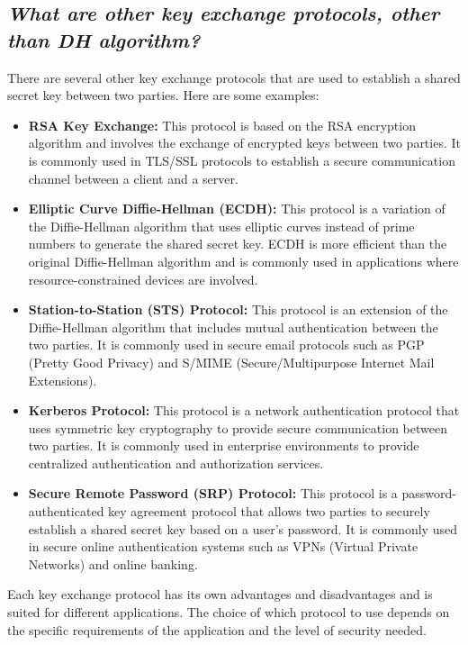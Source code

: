 \documentclass{article}
\begin{document}
\subsection{\textit{What are other key exchange protocols, other than DH algorithm?}}
There are several other key exchange protocols that are used to establish a shared secret key between two parties. Here are some examples:
\begin{itemize}
    \item \textbf{RSA Key Exchange:} This protocol is based on the RSA encryption algorithm and involves the exchange of encrypted keys between two parties. It is commonly used in TLS/SSL protocols to establish a secure communication channel between a client and a server.
    \item \textbf{Elliptic Curve Diffie-Hellman (ECDH):} This protocol is a variation of the Diffie-Hellman algorithm that uses elliptic curves instead of prime numbers to generate the shared secret key. ECDH is more efficient than the original Diffie-Hellman algorithm and is commonly used in applications where resource-constrained devices are involved.
    \item \textbf{Station-to-Station (STS) Protocol:} This protocol is an extension of the Diffie-Hellman algorithm that includes mutual authentication between the two parties. It is commonly used in secure email protocols such as PGP (Pretty Good Privacy) and S/MIME (Secure/Multipurpose Internet Mail Extensions).
    \item \textbf{Kerberos Protocol:} This protocol is a network authentication protocol that uses symmetric key cryptography to provide secure communication between two parties. It is commonly used in enterprise environments to provide centralized authentication and authorization services.
    \item \textbf{Secure Remote Password (SRP) Protocol:} This protocol is a password-authenticated key agreement protocol that allows two parties to securely establish a shared secret key based on a user's password. It is commonly used in secure online authentication systems such as VPNs (Virtual Private Networks) and online banking.
\end{itemize}
Each key exchange protocol has its own advantages and disadvantages and is suited for different applications. The choice of which protocol to use depends on the specific requirements of the application and the level of security needed.
\end{document}
